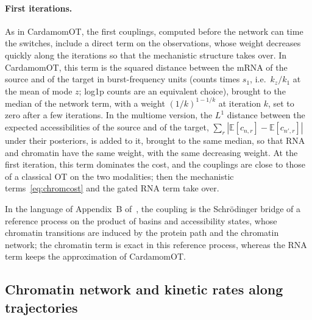 \documentclass[a4paper, 11pt]{article}
\newcommand{\E}{\mathbb{E}}
\theoremstyle{plain}
\theoremstyle{remark}
\begin{document}
\paragraph{First iterations.} As in CardamomOT, the first couplings, computed before the network can time the switches, include a direct term on the observations, whose weight decreases quickly along the iterations so that the mechanistic structure takes over. In CardamomOT, this term is the squared distance between the mRNA of the source and of the target in burst-frequency units (counts times $s_1$, i.e.\ $k_z/k_1$ at the mean of mode $z$; log1p counts are an equivalent choice), brought to the median of the network term, with a weight $(1/k)^{1 - 1/k}$ at iteration $k$, set to zero after a few iterations. In the multiome version, the $L^1$ distance between the expected accessibilities of the source and of the target, $\sum_r |\E[c_{n,r}] - \E[c_{n',r}]|$ under their posteriors, is added to it, brought to the same median, so that RNA and chromatin have the same weight, with the same decreasing weight. At the first iteration, this term dominates the cost, and the couplings are close to those of a classical OT on the two modalities; then the mechanistic terms~\eqref{eq:chromcost} and the gated RNA term take over.

In the language of Appendix~B of~\cite{mauge2026cardamomot}, the coupling is the Schrödinger bridge of a reference process on the product of basins and accessibility states, whose chromatin transitions are induced by the protein path and the chromatin network; the chromatin term is exact in this reference process, whereas the RNA term keeps the approximation of CardamomOT.

\subsection{Chromatin network and kinetic rates along trajectories}\label{sec:chromnet}
\end{document}
